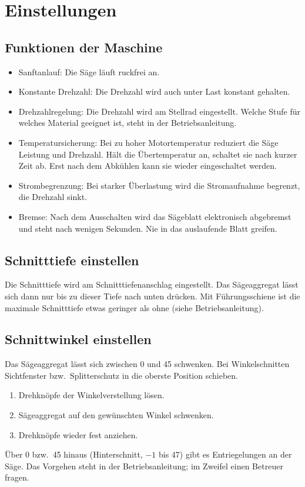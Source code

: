\documentclass{\basedir/fablab-document}
\begin{document}
	\section{Einstellungen}

	\subsection{Funktionen der Maschine}
	\begin{itemize}
		\item Sanftanlauf: Die Säge läuft ruckfrei an.
		\item Konstante Drehzahl: Die Drehzahl wird auch unter Last konstant gehalten.
		\item Drehzahlregelung: Die Drehzahl wird am Stellrad eingestellt. Welche Stufe für welches Material geeignet ist, steht in der Betriebsanleitung.
		\item Temperatursicherung: Bei zu hoher Motortemperatur reduziert die Säge Leistung und Drehzahl. Hält die Übertemperatur an, schaltet sie nach kurzer Zeit ab. Erst nach dem Abkühlen kann sie wieder eingeschaltet werden.
		\item Strombegrenzung: Bei starker Überlastung wird die Stromaufnahme begrenzt, die Drehzahl sinkt.
		\item Bremse: Nach dem Ausschalten wird das Sägeblatt elektronisch abgebremst und steht nach wenigen Sekunden. Nie in das auslaufende Blatt greifen.
	\end{itemize}

	\subsection{Schnitttiefe einstellen}
	Die Schnitttiefe wird am Schnitttiefenanschlag eingestellt. Das Sägeaggregat lässt sich dann nur bis zu dieser Tiefe nach unten drücken. Mit Führungsschiene ist die maximale Schnitttiefe etwas geringer als ohne (siehe Betriebsanleitung).

	\subsection{Schnittwinkel einstellen}
	Das Sägeaggregat lässt sich zwischen 0\textdegree{} und 45\textdegree{} schwenken. Bei Winkelschnitten Sichtfenster bzw.\ Splitterschutz in die oberste Position schieben.
	\begin{enumerate}
		\item Drehknöpfe der Winkelverstellung lösen.
		\item Sägeaggregat auf den gewünschten Winkel schwenken.
		\item Drehknöpfe wieder fest anziehen.
	\end{enumerate}
	Über 0\textdegree{} bzw.\ 45\textdegree{} hinaus (Hinterschnitt, $-1$\textdegree{} bis 47\textdegree) gibt es Entriegelungen an der Säge. Das Vorgehen steht in der Betriebsanleitung; im Zweifel einen Betreuer fragen.
\end{document}
